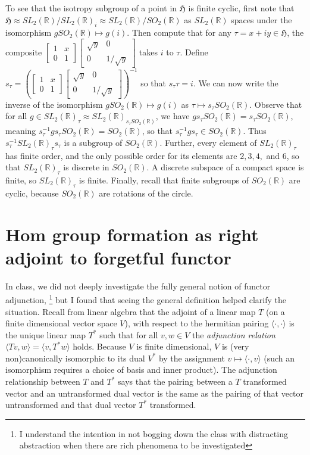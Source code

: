 \documentclass[18pt]{amsart}
\newcommand{\ip}[2]{\langle #1, #2 \rangle}
\newcommand{\R}{\mathbb{R}}
\newcommand{\tbt}[4]{\left[ \begin{smallmatrix}
		#1 & #2 \\
		#3 & #4 
	\end{smallmatrix} \right] }
\begin{document}
	To see that the isotropy subgroup of a point in $\mathfrak{H}$ is finite cyclic, first note that $\mathfrak{H}\approx SL_2(\R)/SL_2(\R)_i\approx SL_2(\R)/SO_2(\R)$ as $SL_2(\R)$ spaces under the isomorphism $gSO_2(\R)\mapsto g(i)$. Then compute that for any $\tau=x+iy\in\mathfrak{H}$, the composite $\tbt{1}{x}{0}{1}\tbt{\sqrt{y}}{0}{0}{1/\sqrt{y}}$ takes $i$ to $\tau$.  Define $s_\tau=\left(\tbt{1}{x}{0}{1}\tbt{\sqrt{y}}{0}{0}{1/\sqrt{y}}\right)^{-1}$ so that $s_\tau \tau=i$.  We can now write the inverse of the isomorphism $gSO_2(\R)\mapsto g(i)$ as $\tau\mapsto s_\tau SO_2(\R)$. Observe that for all $g\in SL_2(\R)_\tau \approx SL_2(\R)_{s_\tau SO_2(\R)}$, we have $g s_\tau SO_2(\R)=s_\tau SO_2(\R)$, meaning $s_{\tau}^{-1} g s_\tau SO_2(\R)=SO_2(\R)$, so that $s_{\tau}^{-1} g s_\tau \in SO_2(\R)$. Thus $s_{\tau}^{-1} SL_2(\R)_\tau s_\tau$ is a subgroup of $SO_2(\R)$. Further, every element of $SL_2(\R)_\tau$ has finite order, and the only possible order for its elements are $2,3,4,$ and $6$, so that $SL_2(\R)_\tau$ is discrete in $SO_2(\R)$. A discrete subspace of a compact space is finite, so $SL_2(\R)_\tau$ is finite. Finally, recall that finite subgroups of $SO_2(\R)$ are cyclic, because $SO_2(\R)$ are rotations of the circle. 

\section{Hom group formation as right adjoint to forgetful functor}
	In class, we did not deeply investigate the fully general notion of functor adjunction, \footnote{I understand the intention in not bogging down the class with distracting abstraction when there are rich phenomena to be investigated} but I found that seeing the general definition helped clarify the situation. Recall from linear algebra that the adjoint of a linear map $T$ (on a finite dimensional vector space $V$), with respect to the hermitian pairing $\ip{\cdot}{\cdot}$ is the unique linear map $T^*$ such that for all $v,w \in V$ the \emph{adjunction relation} $\ip{Tv}{w}=\ip{v}{T^*w}$ holds. Because $V$ is finite dimensional, $V$ is (very non)canonically isomorphic to its dual $V^*$ by the assignment $v \mapsto \ip{\cdot}{v}$ (such an isomorphism requires a choice of basis and inner product). The adjunction relationship between $T$ and $T^*$ says that the pairing between a $T$ transformed vector and an untransformed dual vector is the same as the pairing of that vector untransformed and that dual vector $T^*$ transformed. 
	
\end{document}
